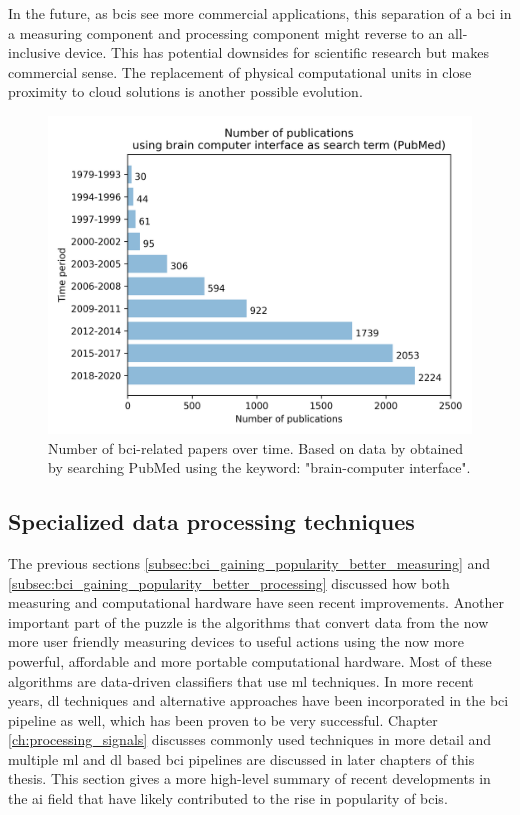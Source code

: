 In the future, as \glspl{bci} see more commercial applications, this separation of a \gls{bci} in a measuring component and processing component might reverse to an all-inclusive device.
This has potential downsides for scientific research but makes commercial sense.
The replacement of physical computational units in close proximity to cloud solutions is another possible evolution.

\begin{figure}[ht]
    \centering
    \includegraphics[width=0.7\linewidth]{images/introduction/papers_on_bci.png}
    \captionsetup{width=0.65\linewidth}
    \captionsetup{justification=centering}
    \caption{Number of \gls{bci}-related papers over time. Based on data by \citet{bci_progress_overview} obtained by searching PubMed using the keyword: "brain-computer interface".}
    \label{fig:bci_publications}
\end{figure}



\subsection{Specialized data processing techniques}
\label{subsec:bci_gaining_popularity_improved_data_processing}


The previous sections \ref{subsec:bci_gaining_popularity_better_measuring} and \ref{subsec:bci_gaining_popularity_better_processing} discussed how both measuring and computational hardware have seen recent improvements.
Another important part of the puzzle is the algorithms that convert data from the now more user friendly measuring devices to useful actions using the now more powerful, affordable and more portable computational hardware.
Most of these algorithms are data-driven classifiers that use \gls{ml} techniques.
In more recent years, \gls{dl} techniques and alternative approaches have been incorporated in the \gls{bci} pipeline as well, which has been proven to be very successful. 
Chapter \ref{ch:processing_signals} discusses commonly used techniques in more detail and multiple \gls{ml} and \gls{dl} based \gls{bci} pipelines are discussed in later chapters of this thesis.
This section gives a more high-level summary of recent developments in the \gls{ai} field that have likely contributed to the rise in popularity of \glspl{bci}.

